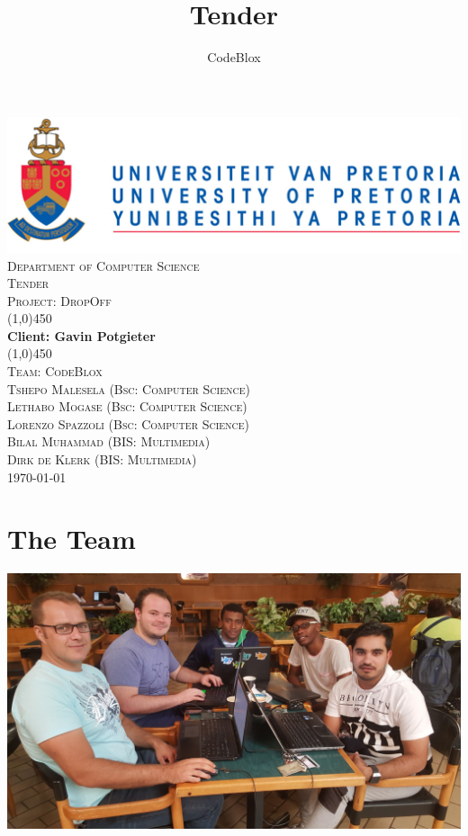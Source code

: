 \documentclass[a4paper,12pt]{article}
\author{CodeBlox}
\title{Tender}
\begin{document}
	\setlength{\parskip}{6pt}
	
	\begin{titlepage}
		\begin{center}
			\includegraphics[width=1\textwidth]{./Pictures/up_logo.png}\\[1.5cm] 
			\textsc{\LARGE Department of Computer Science} \\ [.5cm]
			\textsc{\Large Tender} \\ [.5cm]
			\textsc{\Large Project: DropOff} \\ [.5cm]
			\line(1,0){450}\\[.5cm]
			\huge{\bfseries Client: Gavin Potgieter}\\
			\line(1,0){450}\\[.5cm]
			\textsc{\LARGE Team: CodeBlox}\\ [0.5cm]
			
			
			\textsc{\large Tshepo Malesela (Bsc: Computer Science)}\\
			\textsc{\large Lethabo Mogase (Bsc: Computer Science)}\\
			\textsc{\large Lorenzo Spazzoli (Bsc: Computer Science)}\\
			\textsc{\large Bilal Muhammad (BIS: Multimedia)}\\
			\textsc{\large Dirk de Klerk (BIS: Multimedia)}\\ [3.9cm]
			
			\large\today
		\end{center}
	\end{titlepage}
	
	\tableofcontents
	\thispagestyle{empty}
	\footnotesize
	\normalsize
	
	
	
	
	\newpage
	\section{The Team}
	
	\includegraphics[width=1\textwidth]{./Pictures/the_group.jpg}\\
	
\end{document}
